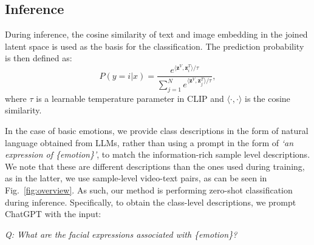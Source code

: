 \documentclass[10pt,twocolumn,letterpaper]{article}
\begin{document}
\subsection{Inference}

During inference, the cosine similarity of text and image embedding in the joined latent space is used as the basis for the classification. The prediction probability is then defined as:
\begin{equation}
    P(y = i | x) = \frac{e^{\langle \textbf{z}^V, \textbf{z}^T_i \rangle / \tau}}{\sum_{j=1}^N e^{\langle \textbf{z}^V, \textbf{z}^T_j \rangle / \tau}},
\end{equation}
where $\tau$ is a learnable temperature parameter in CLIP and $\langle \cdot, \cdot \rangle$ is the cosine similarity. 

In the case of basic emotions, we provide class descriptions in the form of natural language obtained from LLMs, rather than using a prompt in the form of \textit{`an expression of \{emotion\}'}, to match the information-rich sample level descriptions. We note that these are different descriptions than the ones used during training, as in the latter, we use sample-level video-text pairs, as can be seen in Fig.~\ref{fig:overview}. As such, our method is performing zero-shot classification during inference.
Specifically, to obtain the class-level descriptions, we prompt ChatGPT with the input:

\textit{Q: What are the facial expressions associated with \{emotion\}?}
\end{document}
